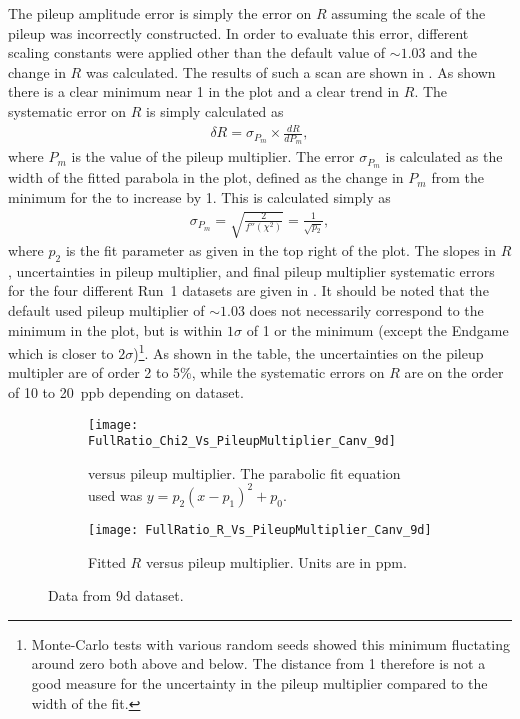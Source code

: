 The pileup amplitude error is simply the error on $R$ assuming the scale of the pileup was incorrectly constructed. In order to evaluate this error, different scaling constants were applied other than the default value of $\sim1.03$ and the change in $R$ was calculated. The results of such a scan are shown in . As shown there is a clear minimum near 1 in the \chisq plot and a clear trend in $R$. The systematic error on $R$ is simply calculated as 
    \begin{align}
        \delta R = \sigma_{P_{m}} \times \frac{dR}{dP_{m}},
    \end{align}
where $P_{m}$ is the value of the pileup multiplier. The error $\sigma_{P_{m}}$ is calculated as the width of the fitted parabola in the \chisq plot, defined as the change in $P_{m}$ from the minimum for the \chisq to increase by 1. This is calculated simply as 
    \begin{align}
        \sigma_{P_{m}} = \sqrt{\frac{2}{f''(\chi^{2})}} = \frac{1}{\sqrt{p_{2}}},
    \end{align}
where $p_{2}$ is the fit parameter as given in the top right of the \chisq plot. The slopes in $R$, uncertainties in pileup multiplier, and final pileup multiplier systematic errors for the four different Run~1 datasets are given in . It should be noted that the default used pileup multiplier of $\sim1.03$ does not necessarily correspond to the minimum in the \chisq plot, but is within $1\sigma$ of 1 or the minimum (except the Endgame which is closer to $2\sigma$)\footnote{Monte-Carlo tests with various random seeds showed this minimum fluctating around zero both above and below. The distance from 1 therefore is not a good measure for the uncertainty in the pileup multiplier compared to the width of the \chisq fit.}. As shown in the table, the uncertainties on the pileup multipler are of order 2 to 5\%, while the systematic errors on $R$ are on the order of \SI{10}{} to \SI{20}{ppb} depending on dataset. 


\begin{figure}[]
\centering
    \begin{subfigure}[t]{0.45\textwidth}
        \centering
        \texttt{[image: FullRatio\_Chi2\_Vs\_PileupMultiplier\_Canv\_9d]}
        \caption{\chisq versus pileup multiplier. The parabolic fit equation used was $y = p_{2}(x - p_{1})^{2} + p_{0}.$}
    \end{subfigure}%
    \hspace{1cm}
    \begin{subfigure}[t]{0.45\textwidth}
        \centering
        \texttt{[image: FullRatio\_R\_Vs\_PileupMultiplier\_Canv\_9d]}
        \caption{Fitted $R$ versus pileup multiplier. Units are in ppm.}
    \end{subfigure}
\caption[]{Data from 9d dataset.}
\label{fig:PMscan}
\end{figure}


